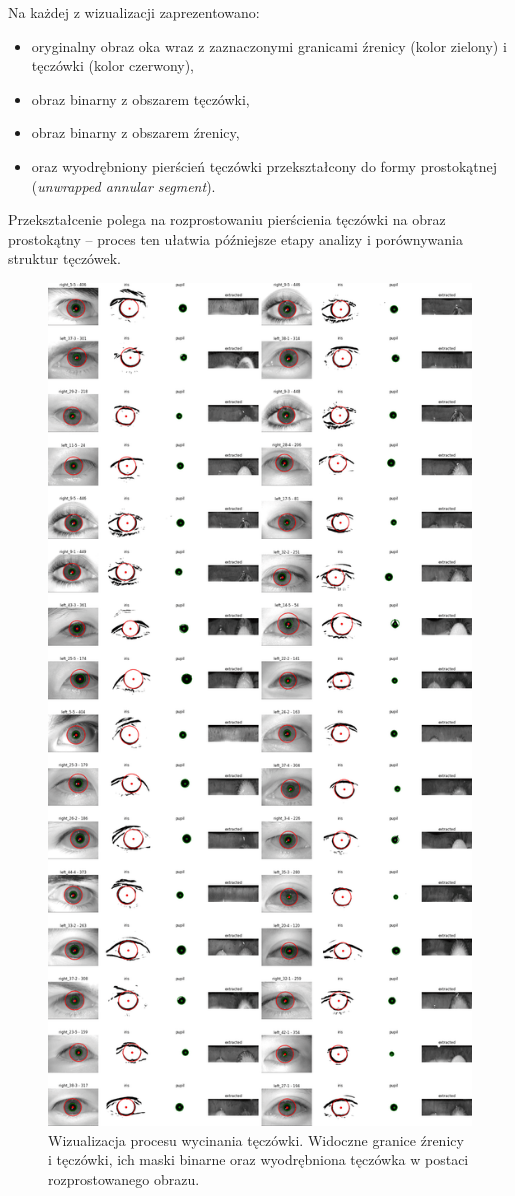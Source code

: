 \documentclass[a4paper]{article}
\begin{document}
Na każdej z wizualizacji zaprezentowano:
\begin{itemize}
    \item oryginalny obraz oka wraz z zaznaczonymi granicami źrenicy (kolor zielony) i tęczówki (kolor czerwony),
    \item obraz binarny z obszarem tęczówki,
    \item obraz binarny z obszarem źrenicy,
    \item oraz wyodrębniony pierścień tęczówki przekształcony do formy prostokątnej (\textit{unwrapped annular segment}).
\end{itemize}

Przekształcenie polega na rozprostowaniu pierścienia tęczówki na obraz prostokątny – proces ten ułatwia późniejsze etapy analizy i porównywania struktur tęczówek.

\begin{figure}[H]
    \centering
    \includegraphics[width=0.7\linewidth]{figures/final_comphrasion.png}
    \caption{Wizualizacja procesu wycinania tęczówki. Widoczne granice źrenicy i tęczówki, ich maski binarne oraz wyodrębniona tęczówka w postaci rozprostowanego obrazu.}
    \label{fig:final_comparison}
\end{figure}
\end{document}
